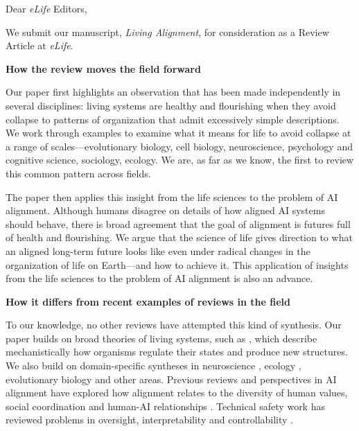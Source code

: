 \documentclass[11pt]{letter}
\begin{document}
\fontsize{11.2}{14}\selectfont
\pagestyle{empty}

Dear \textit{eLife} Editors,

We submit our manuscript, \textit{Living Alignment}, for consideration as a Review Article at \textit{eLife}. 

\textbf{How the review moves the field forward}

Our paper first highlights an observation that has been made independently in several disciplines: living systems are healthy and flourishing when they avoid collapse to patterns of organization that admit excessively simple descriptions. We work through examples to examine what it means for life to avoid collapse at a range of scales---evolutionary biology, cell biology, neuroscience, psychology and cognitive science, sociology, ecology. We are, as far as we know, the first to review this common pattern across fields.


The paper then applies this insight from the life sciences to the problem of AI alignment. Although humans disagree on details of how aligned AI systems should behave, there is broad agreement that the goal of alignment is futures full of health and flourishing. We argue that the science of life gives direction to what an aligned long-term future looks like even under radical changes in the organization of life on Earth---and how to achieve it. This application of insights from the life sciences to the problem of AI alignment is also an advance.

\textbf{How it differs from recent examples of reviews in the field}

To our knowledge, no other reviews have attempted this kind of synthesis. Our paper builds on broad theories of living systems, such as \cite{luisi2003autopoiesis, moreno2015biological, kirchhoff2018markov}, which describe mechanistically how organisms regulate their states and produce new structures. We also build on domain-specific syntheses in neuroscience \citep{kurth2023replay}, ecology \citep{holling1973resilience}, evolutionary biology \citep{goodenough2014origins} and other areas. Previous reviews and perspectives in AI alignment have explored how alignment relates to the diversity of human values, social coordination and human-AI relationships \citep{gabriel2020artificial, gabriel2025matter,leibo2026theory, sorensen2024roadmap, dafoe2020open, kirk2024benefits, kirk2025human}. Technical safety work has reviewed problems in oversight, interpretability and controllability \citep{ji2023ai, anwar2024foundational, bereska2024mechanistic, russell2019human, cohen2024regulating}. 
\end{document}
